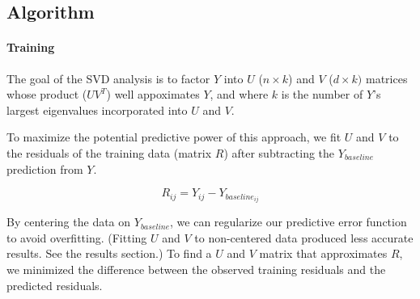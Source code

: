 \documentclass[12pt]{article}
\begin{document}

\subsection*{Algorithm}
\paragraph{Training} The goal of the SVD analysis is to factor $Y$ into $U$ ($n \times k$) and $V$ ($d \times k)$ matrices whose product ($U V^T$) well appoximates $Y$, and where $k$ is the number of $Y$'s largest eigenvalues incorporated into $U$ and $V$.

To maximize the potential predictive power of this approach, we fit $U$ and $V$ to the residuals of the training data (matrix $R$) after subtracting the $Y_{baseline}$ prediction from $Y$.

 $$ R_{ij} = Y_{ij} - Y_{baseline_{ij}} $$

 By centering the data on $Y_{baseline}$, we can regularize our predictive error function to avoid overfitting. (Fitting $U$ and $V$ to non-centered data produced less accurate results. See the results section.) To find a $U$ and $V$ matrix that approximates $R$, we minimized the difference between the observed training residuals and the predicted residuals.
\end{document}
